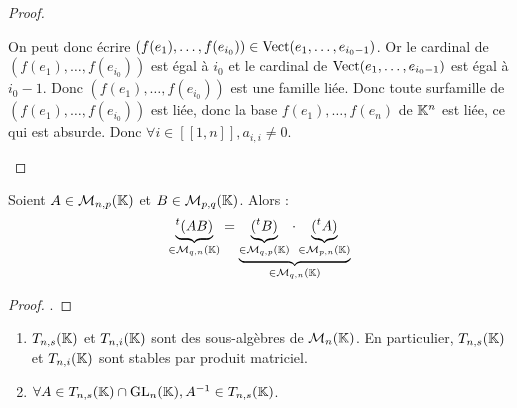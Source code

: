 \documentclass[12pt,a4paper]{report}
\begin{document}
\begin{proof}
\begin{outline}
        \2 On peut donc écrire $(f(e_1),\dots,f(e_{i_0})) \in \mathrm{Vect}(e_1,\dots,e_{i_0-1})$.
        \2 Or le cardinal de $(f(e_1),\dots,f(e_{i_0}))$ est égal à $i_0$ et le cardinal de $\mathrm{Vect}(e_1,\dots,e_{i_0-1})$ est égal à $i_0-1$.
        \2 Donc $(f(e_1),\dots,f(e_{i_0}))$ est une famille liée.
        \2 Donc toute surfamille de $(f(e_1),\dots,f(e_{i_0}))$ est liée, donc la base $f(e_1),\dots,f(e_n)$ de $\mathbb{K}^n$ est liée, ce qui est absurde.
        \2 Donc $\forall i \in [\![1,n]\!], a_{i,i} \ne 0$.
    \end{outline}
\end{proof}

\begin{property}
    Soient $A \in \mathcal M_{n,p}(\mathbb{K})$ et $B \in \mathcal M_{p,q}(\mathbb{K})$. Alors :
    $$\underbrace{^t(AB)}_{\in \mathcal M_{q,n}(\mathbb{K})} = \underbrace{\underbrace{(^tB)}_{\in \mathcal M_{q,p}(\mathbb{K})} \cdot \underbrace{(^tA)}_{\in \mathcal M_{p,n}(\mathbb{K})}}_{\in \mathcal M_{q,n}(\mathbb{K})}$$
\end{property}

\begin{proof}
.
\end{proof}

\begin{property}
    \begin{enumerate}
        \item $T_{n,s}(\mathbb{K})$ et $T_{n,i}(\mathbb{K})$ sont des sous-algèbres de $\mathcal M_n(\mathbb{K})$. En particulier, $T_{n,s}(\mathbb{K})$ et $T_{n,i}(\mathbb{K})$ sont stables par produit matriciel.
        \item $\forall A \in T_{n,s}(\mathbb{K})\cap \mathrm{GL}_n(\mathbb{K}), A^{-1} \in T_{n,s}(\mathbb{K})$.
    \end{enumerate}
\end{property}
\end{document}
